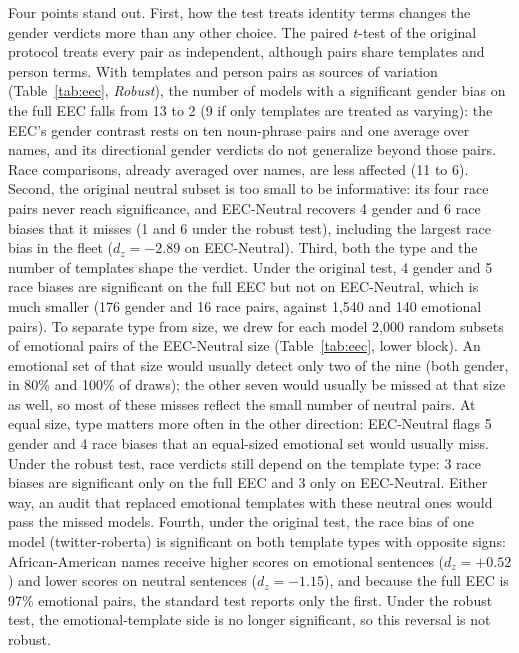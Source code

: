 \documentclass[runningheads]{llncs}
\begin{document}
Four points stand out. First, how the test treats identity terms changes the
gender verdicts more than any other choice. The paired $t$-test of the original
protocol treats every pair as independent, although pairs share templates and
person terms. With templates and person pairs as sources of variation
(Table~\ref{tab:eec}, \emph{Robust}), the number of models with a significant
gender bias on the full EEC falls from 13 to 2 (9 if only templates are
treated as varying): the EEC's gender contrast rests on ten noun-phrase pairs
and one average over names, and its directional gender verdicts do not
generalize beyond those pairs. Race comparisons, already averaged over names,
are less affected (11 to 6). Second, the original neutral subset is too small
to be informative: its four race pairs never reach significance, and
EEC-Neutral recovers 4 gender and 6 race biases that it misses (1 and 6 under
the robust test), including the largest race bias in the fleet ($d_z = -2.89$
on EEC-Neutral). Third, both the type and the number of templates shape the
verdict. Under the original test, 4 gender and 5 race biases are
significant on the full EEC but not on EEC-Neutral, which is much smaller (176
gender and 16 race pairs, against 1,540 and 140 emotional pairs). To separate
type from size, we drew for each model 2,000 random subsets of emotional pairs
of the EEC-Neutral size (Table~\ref{tab:eec}, lower block). An emotional set of
that size would usually detect only two of the nine (both gender, in 80\% and
100\% of draws); the other seven would usually be missed at that size as well,
so most of these misses reflect the small number of neutral pairs. At equal
size, type matters more often in the other direction: EEC-Neutral flags 5
gender and 4 race biases that an equal-sized emotional set would usually miss.
Under the robust test, race verdicts still depend on the template type: 3 race
biases are significant only on the full EEC and 3 only on EEC-Neutral. Either
way, an audit that replaced emotional templates with these neutral ones would
pass the missed models. Fourth, under the original test, the race bias of one
model (twitter-roberta) is significant on both template types with opposite
signs: African-American names receive higher scores on emotional sentences
($d_z=+0.52$) and lower scores on neutral sentences ($d_z=-1.15$), and because
the full EEC is 97\% emotional pairs, the standard test reports only the
first. Under the robust test, the emotional-template side is no longer
significant, so this reversal is not robust.
\end{document}
